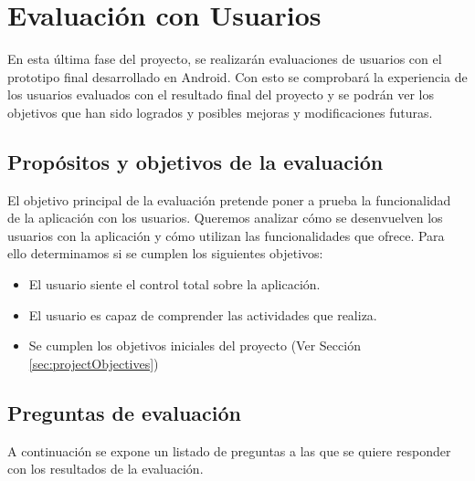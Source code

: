 \newpage
\thispagestyle{sectioned}
\chapter{Evaluación con Usuarios}

En esta última fase del proyecto, se realizarán evaluaciones de usuarios con el prototipo final desarrollado en Android. Con esto se comprobará la experiencia de los usuarios evaluados con el resultado final del proyecto y se podrán ver los objetivos que han sido logrados y posibles mejoras y modificaciones futuras.

\section{Propósitos y objetivos de la evaluación}

El objetivo principal de la evaluación pretende poner a prueba la funcionalidad de la aplicación con los usuarios. Queremos analizar cómo se desenvuelven los usuarios con la aplicación y cómo utilizan las funcionalidades que ofrece. Para ello determinamos si se cumplen los siguientes objetivos:

\begin{itemize}
 \item El usuario siente el control total sobre la aplicación.
 \item El usuario es capaz de comprender las actividades que realiza.
 \item Se cumplen los objetivos iniciales del proyecto (Ver Sección \ref{sec:projectObjectives})
\end{itemize}

\section{Preguntas de evaluación}

A continuación se expone un listado de preguntas a las que se quiere responder con los resultados de la evaluación.

